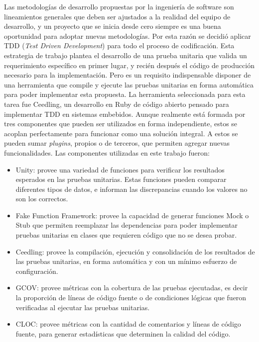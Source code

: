 Las metodologías de desarrollo propuestas por la ingeniería de software son lineamientos generales que deben ser ajustados a la realidad del equipo de desarrollo, y un proyecto que se inicia desde cero siempre es una buena oportunidad para adoptar nuevas metodologías. Por esta razón se decidió aplicar TDD (\emph{Test Driven Development}) para todo el proceso de codificación. Esta estrategia de trabajo plantea el desarrollo de una prueba unitaria que valida un requerimiento específico en primer lugar, y recién después el código de producción necesario para la implementación. Pero es un requisito indispensable disponer de una herramienta que compile y ejecute las pruebas unitarias en forma automática para poder implementar esta propuesta. La herramienta seleccionada para esta tarea fue Ceedling, un desarrollo en Ruby de código abierto pensado para implementar TDD en sistemas embebidos. Aunque realmente está formada por tres componentes que pueden ser utilizados en forma independiente, estos se acoplan perfectamente para funcionar como una solución integral. A estos se pueden sumar \emph{plugins}, propios o de terceros, que permiten agregar nuevas funcionalidades. Las componentes utilizadas en este trabajo fueron:

\begin{itemize}
	\item Unity: provee una variedad de funciones para verificar los resultados esperados en las pruebas unitarias. Estas funciones pueden comparar diferentes tipos de datos, e informan las discrepancias cuando los valores no son los correctos.

	\item Fake Function Framework: provee la capacidad de generar funciones Mock o Stub que permiten reemplazar las dependencias para poder implementar pruebas unitarias en clases que requieren código que no se desea probar.
	
	\item Ceedling: provee la compilación, ejecución y consolidación de los resultados de las pruebas unitarias, en forma automática y con un mínimo esfuerzo de configuración.
	
	\item GCOV: provee métricas con la cobertura de las pruebas ejecutadas, es decir la proporción de líneas de código fuente o de condiciones lógicas que fueron verificadas al ejecutar las pruebas unitarias.
	
	\item CLOC: provee métricas con la cantidad de comentarios y líneas de código fuente, para generar estadísticas que determinen la calidad del código.  
\end{itemize}

